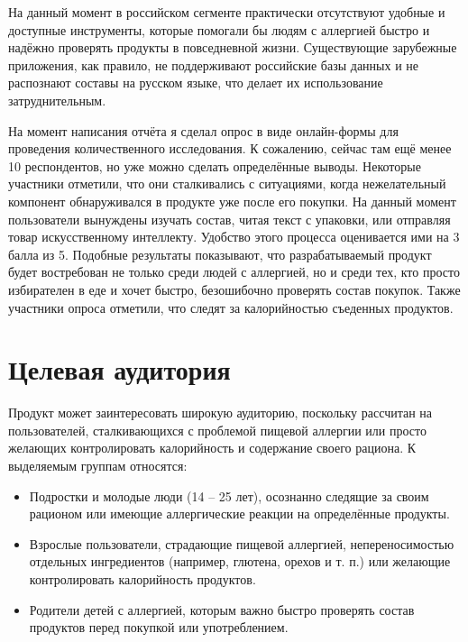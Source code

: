 \documentclass[14pt,a4paper]{extarticle}
\begin{document}
На данный момент в российском сегменте практически отсутствуют удобные и доступные инструменты, которые помогали бы людям с аллергией быстро и надёжно проверять продукты в повседневной жизни. Существующие зарубежные приложения, как правило, не поддерживают российские базы данных и не распознают составы на русском языке, что делает их использование затруднительным.

На момент написания отчёта я сделал опрос в виде онлайн-формы для проведения количественного исследования. К сожалению, сейчас там ещё менее 10 респондентов, но уже можно сделать определённые выводы. Некоторые участники отметили, что они сталкивались с ситуациями, когда нежелательный компонент обнаруживался в продукте уже после его покупки. На данный момент пользователи вынуждены изучать состав, читая текст с упаковки, или отправляя товар искусственному интеллекту. Удобство этого процесса оценивается ими на 3 балла из 5. Подобные результаты показывают, что разрабатываемый продукт будет востребован не только среди людей с аллергией, но и среди тех, кто просто избирателен в еде и хочет быстро, безошибочно проверять состав покупок. Также участники опроса отметили, что следят за калорийностью съеденных продуктов.



\section{Целевая аудитория}

Продукт может заинтересовать широкую аудиторию, поскольку рассчитан на пользователей, сталкивающихся с проблемой пищевой аллергии или просто желающих контролировать калорийность и содержание своего рациона. К выделяемым группам относятся:

\begin{itemize}

\item Подростки и молодые люди (14 – 25 лет), осознанно следящие за своим рационом или имеющие аллергические реакции на определённые продукты.

\item Взрослые пользователи, страдающие пищевой аллергией, непереносимостью отдельных ингредиентов (например, глютена, орехов и т. п.) или желающие контролировать калорийность продуктов.

\item Родители детей с аллергией, которым важно быстро проверять состав продуктов перед покупкой или употреблением.

\end{itemize}
\end{document}
